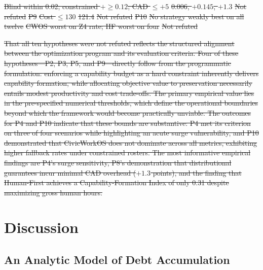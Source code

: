 \documentclass[utf8]{FrontiersinHarvard}
\providecommand{\DIFdel}[1]{{\protect\color{red}\sout{#1}}}                      %
\providecommand{\DIFdelend}{} %
\providecommand{\DIFdelFL}[1]{\DIFdel{#1}} %
\begin{document}
\DIFdelFL{Blind within 0.02; constrained $+\geq 0.12$; CAD $\leq +5$ }%
\DIFdelFL{0.006, $+0.145$, $+1.3$ }%
\DIFdelFL{Not refuted}%
\DIFdelFL{P9 }%
\DIFdelFL{Cost $\leq 130$ }%
\DIFdelFL{121.4 }%
\DIFdelFL{Not refuted}%
\DIFdelFL{P10 }%
\DIFdelFL{No strategy weakly best on all twelve }%
\DIFdelFL{CWOS worst on Z4 rate; HF worst on four }%
\DIFdelFL{Not refuted}%

\DIFdel{That all ten hypotheses were not refuted reflects the structured alignment between the optimization program and its evaluation criteria. Four of these hypotheses---P2, P3, P5, and P9---directly follow from the programmatic formulation: enforcing a capability budget as a hard constraint inherently delivers capability formation, while allocating objective value to preservation necessarily entails modest productivity and cost trade-offs. The primary empirical value lies in the pre-specified numerical thresholds, which define the operational boundaries beyond which the framework would become practically unviable. The outcomes for P4 and P10 indicate that these bounds are substantive: P4 met its criterion on three of four scenarios while highlighting an acute surge vulnerability, and P10 demonstrated that CivicWorkOS does not dominate across all metrics, exhibiting higher fallback rates under constrained rosters. The most informative empirical findings are P4's surge sensitivity, P8's demonstration that distributional guarantees incur minimal CAD overhead ($+1.3$ points), and the finding that Human-First achieves a Capability-Formation Index of only 0.31 despite maximizing gross human hours.
	}%


\DIFdelend \section{Discussion}
	\label{sec:discussion}

	\subsection{An Analytic Model of Debt Accumulation}
	\label{sec:cadmodel}
\end{document}
